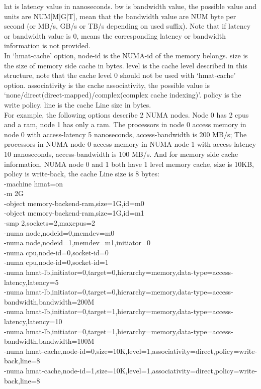 \documentclass[11pt, a4paper, oneside]{article}
\theoremstyle{definition}
\begin{document}
    lat is latency value in nanoseconds. bw is bandwidth value, the possible value and units are NUM[M|G|T], mean that the bandwidth value are NUM byte per second (or MB/s, GB/s or TB/s depending on used suffix). Note that if latency or bandwidth value is 0, means the corresponding latency or bandwidth information is not provided.\\

    In ‘hmat-cache’ option, node-id is the NUMA-id of the memory belongs. size is the size of memory side cache in bytes. level is the cache level described in this structure, note that the cache level 0 should not be used with ‘hmat-cache’ option. associativity is the cache associativity, the possible value is ‘none/direct(direct-mapped)/complex(complex cache indexing)’. policy is the write policy. line is the cache Line size in bytes.\\

    For example, the following options describe 2 NUMA nodes. Node 0 has 2 cpus and a ram, node 1 has only a ram. The processors in node 0 access memory in node 0 with access-latency 5 nanoseconds, access-bandwidth is 200 MB/s; The processors in NUMA node 0 access memory in NUMA node 1 with access-latency 10 nanoseconds, access-bandwidth is 100 MB/s. And for memory side cache information, NUMA node 0 and 1 both have 1 level memory cache, size is 10KB, policy is write-back, the cache Line size is 8 bytes:\\

    -machine hmat=on \\
    -m 2G \\
    -object memory-backend-ram,size=1G,id=m0 \\
    -object memory-backend-ram,size=1G,id=m1 \\
    -smp 2,sockets=2,maxcpus=2 \\
    -numa node,nodeid=0,memdev=m0 \\
    -numa node,nodeid=1,memdev=m1,initiator=0 \\
    -numa cpu,node-id=0,socket-id=0 \\
    -numa cpu,node-id=0,socket-id=1 \\
    -numa hmat-lb,initiator=0,target=0,hierarchy=memory,data-type=access-latency,latency=5 \\
    -numa hmat-lb,initiator=0,target=0,hierarchy=memory,data-type=access-bandwidth,bandwidth=200M \\
    -numa hmat-lb,initiator=0,target=1,hierarchy=memory,data-type=access-latency,latency=10 \\
    -numa hmat-lb,initiator=0,target=1,hierarchy=memory,data-type=access-bandwidth,bandwidth=100M \\
    -numa hmat-cache,node-id=0,size=10K,level=1,associativity=direct,policy=write-back,line=8 \\
    -numa hmat-cache,node-id=1,size=10K,level=1,associativity=direct,policy=write-back,line=8\\
\end{document}
